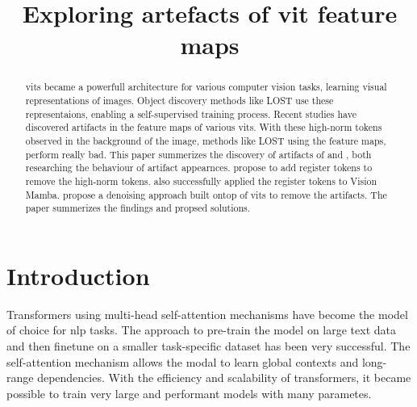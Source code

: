 \documentclass[conference]{IEEEtran}
\begin{document}
  \title{Exploring artefacts of \acl{vit} feature maps}

  \author{
    }

  \maketitle

  \begin{abstract}
  \acfp{vit} became a powerfull architecture for various computer vision tasks, learning visual representations of images. Object discovery methods like LOST \cite{lost} use these representaions, enabling a self-supervised training process. Recent studies have discovered artifacts in the feature maps of various \acp{vit}. With these high-norm tokens observed in the background of the image, methods like LOST using the feature maps, perform really bad. This paper summerizes the discovery of artifacts of \citeauthor{registers} and \citeauthor{denoising}, both researching the behaviour of artifact appearnces. \citeauthor{registers} propose to add register tokens to remove the high-norm tokens. \citeauthor{mamba-needs-registers} also successfully applied the register tokens to Vision Mamba. \citeauthor{denoising} propose a denoising approach built ontop of \acp{vit} to remove the artifacts. The paper summerizes the findings and propsed solutions.
  \end{abstract}


  \IEEEpeerreviewmaketitle

  \section{Introduction}
  \label{sec:introduction}
  
  Transformers \cite{transformer2017} using multi-head self-attention mechanisms have become the model of choice for \ac{nlp} tasks. The approach to pre-train the model on large text data and then finetune on a smaller task-specific dataset has been very successful. The self-attention mechanism allows the modal to learn global contexts and long-range dependencies. With the efficiency and scalability of transformers, it became possible to train very large and performant models with many parametes. \cite{transformer2017} \cite{visiontransformers2021} \cite{vit-state-challenges}
\end{document}
